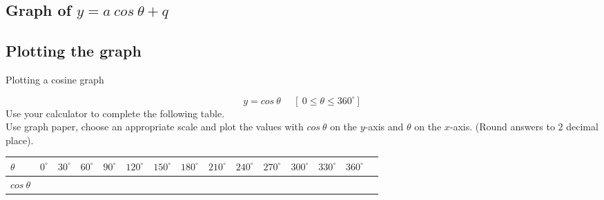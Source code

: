 \subsection{Graph of $y=a~cos~\theta +q$}
\subsection*{Plotting the graph}
\begin{wex}
{Plotting a cosine graph}
{
\begin{equation*}
 y=cos~ \theta~~~~~~[~0 \leq \theta \leq 360^{\circ}]
\end{equation*}
Use your calculator to complete the following table. \\
Use graph paper, choose an appropriate scale and plot the values with $cos~\theta $ on the $y$-axis and $\theta $ on the $x$-axis. (Round answers to $2$ decimal place). 

\begin{table}[H]


\begin{tabular}{|m{0.6cm}|m{0.5cm}|m{0.5cm}|m{0.5cm}|m{0.5cm}|m{0.5cm}|m{0.5cm}|m{0.5cm}|m{0.5cm}|m{0.5cm}|m{0.5cm}|m{0.5cm}|m{0.5cm}|m{0.5cm}|} \hline

\footnotesize$\theta $&
\footnotesize$0^{\circ }$&
\footnotesize$30^{\circ }$&
\footnotesize$60^{\circ }$&
\footnotesize$90^{\circ }$&
\footnotesize$120^{\circ }$&
\footnotesize$150^{\circ }$&
\footnotesize$180^{\circ }$&
\footnotesize$210^{\circ }$&
\footnotesize$240^{\circ }$&
\footnotesize$270^{\circ }$&
\footnotesize$300^{\circ }$&
\footnotesize$330^{\circ }$&
\footnotesize$360^{\circ }$
\\ \hline

\footnotesize$cos~\theta $&
&
&
&
&
&
&
&
&
&
&
&
&
&

 \hline
\end{tabular}

\end{table}
}
{
\begin{table}[H]


\begin{tabular}{|m{0.6cm}|m{0.3cm}|m{0.5cm}|m{0.4cm}|m{0.3cm}|m{0.5cm}|m{0.7cm}|m{0.5cm}|m{0.7cm}|m{0.5cm}|m{0.5cm}|m{0.5cm}|m{0.5cm}|m{0.5cm}|} \hline


\end{tabular}
\end{table}}
\end{wex}
